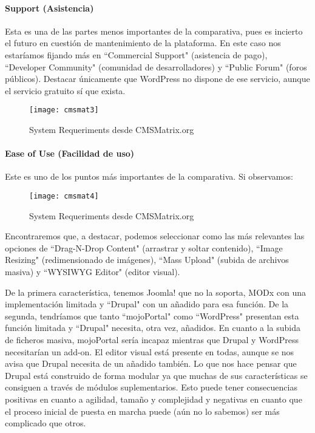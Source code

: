 \paragraph{Support (Asistencia)}

\par Esta es una de las partes menos importantes de la comparativa, pues es incierto el futuro en cuestión de mantenimiento de la plataforma. En este caso nos estaríamos fijando más en ``Commercial Support" (asistencia de pago), ``Developer Community" (comunidad de desarrolladores) y ``Public Forum" (foros públicos). Destacar únicamente que WordPress no dispone de ese servicio, aunque el servicio gratuito sí que exista.

\begin{figure}
\begin{narrow}{-0.2\linewidth}{-0.2\linewidth}
\centering
\texttt{[image: cmsmat3]}
\caption{System Requeriments desde CMSMatrix.org}
\end{narrow}
\label{fig:cmsmat1}
\end{figure}

\paragraph{Ease of Use (Facilidad de uso)}

\par Este es uno de los puntos más importantes de la comparativa. Si observamos:

\begin{figure}
\begin{narrow}{-0.2\linewidth}{-0.2\linewidth}
\centering
\texttt{[image: cmsmat4]}
\caption{System Requeriments desde CMSMatrix.org}
\end{narrow}
\label{fig:cmsmat1}
\end{figure}

\par Encontraremos que, a destacar, podemos seleccionar como las más relevantes las opciones de ``Drag-N-Drop Content" (arrastrar y soltar contenido), ``Image Resizing" (redimensionado de imágenes), ``Mass Upload" (subida de archivos masiva) y ``WYSIWYG Editor" (editor visual).
\par De la primera característica, tenemos Joomla! que no la soporta, MODx con una implementación limitada y ``Drupal" con un añadido para esa función. De la segunda, tendríamos que tanto ``mojoPortal" como ``WordPress" presentan esta función limitada y ``Drupal" necesita, otra vez, añadidos. En cuanto a la subida de ficheros masiva, mojoPortal sería incapaz mientras que Drupal y WordPress necesitarían un add-on. El editor visual está presente en todas, aunque se nos avisa que Drupal necesita de un añadido también. Lo que nos hace pensar que Drupal está construido de forma modular ya que muchas de sus características se consiguen a través de módulos suplementarios. Esto puede tener consecuencias positivas en cuanto a agilidad, tamaño y complejidad y negativas en cuanto que el proceso inicial de puesta en marcha puede (aún no lo sabemos) ser más complicado que otros.



